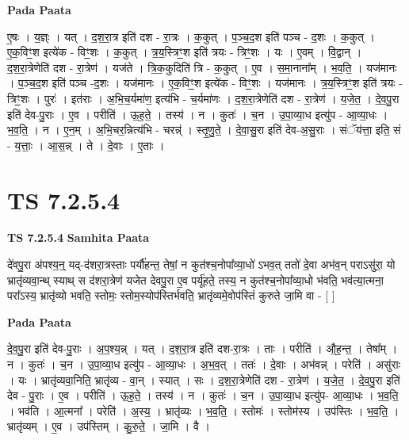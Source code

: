 \documentclass[17pt]{extarticle}
\begin{document}
\textbf{Pada Paata} \newline

ए॒षः । य॒ज्ञ्ः । यत् । द॒श॒रा॒त्र इति॑ दश - रा॒त्रः । क॒कुत् । प॒ञ्च॒द॒श इति॑ पञ्च - द॒शः । क॒कुत् । ए॒क॒विꣳ॒॒श इत्ये॑क - विꣳ॒॒शः । क॒कुत् । त्र॒य॒स्त्रिꣳ॒॒श इति॑ त्रयः - त्रिꣳ॒॒शः । यः । ए॒वम् । वि॒द्वान् । द॒श॒रा॒त्रेणेति॑ दश - रा॒त्रेण॑ । यज॑ते । त्रि॒क॒कुदिति॑ त्रि - क॒कुत् । ए॒व । स॒मा॒नाना᳚म् । भ॒व॒ति॒ । यज॑मानः । प॒ञ्च॒द॒श इति॑ पञ्च -द॒शः । यज॑मानः । ए॒क॒विꣳ॒॒श इत्ये॑क - विꣳ॒॒शः । यज॑मानः । त्र॒य॒स्त्रिꣳ॒॒श इति॑ त्रयः - त्रिꣳ॒॒शः । पुरः॑ । इत॑राः । अ॒भि॒च॒र्यमा॑ण॒ इत्य॑भि - च॒र्यमा॑णः । द॒श॒रा॒त्रेणेति॑ दश - रा॒त्रेण॑ । य॒जे॒त॒ । दे॒व॒पु॒रा इति॑ देव-पु॒राः । ए॒व । परीति॑ । ऊ॒ह॒ते॒ । तस्य॑ । न । कुतः॑ । च॒न । उ॒पा॒व्या॒ध इत्यु॑प - आ॒व्या॒धः । भ॒व॒ति॒ । न । ए॒न॒म् । अ॒भि॒चर॒न्नित्य॑भि - चरन्न्॑ । स्तृ॒णु॒ते॒ । दे॒वा॒सु॒रा इति॑ देव-अ॒सु॒राः । संॅय॑त्ता॒ इति॒ सं - य॒त्ताः॒ । आ॒स॒न्न् । ते । दे॒वाः । ए॒ताः ।  \newline




\section*{ TS 7.2.5.4 }

\textbf{TS 7.2.5.4 } \newline
\textbf{Samhita Paata} \newline

दे॑वपु॒रा अ॑पश्य॒न्॒ यद्-द॑शरा॒त्रस्ताः पर्यौ॑हन्त॒ तेषां॒ न कुत॑श्च॒नोपा᳚व्या॒धो॑ ऽभव॒त् ततो॑ दे॒वा अभ॑व॒न् पराऽसु॑रा॒ यो भ्रातृ॑व्यवा॒न्थ् स्याथ् स द॑शरा॒त्रेण॑ यजेत देवपु॒रा ए॒व पर्यू॑हते॒ तस्य॒ न कुत॑श्च॒नोपा᳚व्या॒धो भ॑वति॒ भव॑त्या॒त्मना॒ परा᳚ऽस्य॒ भ्रातृ॑व्यो भवति॒ स्तोमः॒ स्तोम॒स्योप॑स्तिर्भवति॒ भ्रातृ॑व्यमे॒वोप॑स्तिं कुरुते जा॒मि वा - [  ] \newline

\textbf{Pada Paata} \newline

दे॒व॒पु॒रा इति॑ देव-पु॒राः । अ॒प॒श्य॒न्न् । यत् । द॒श॒रा॒त्र इति॑ दश-रा॒त्रः । ताः । परीति॑ । औ॒ह॒न्त॒ । तेषा᳚म् । न । कुतः॑ । च॒न । उ॒पा॒व्या॒ध इत्यु॑प - आ॒व्या॒धः । अ॒भ॒व॒त् । ततः॑ । दे॒वाः । अभ॑वन्न् । परेति॑ । असु॑राः । यः । भ्रातृ॑व्यवा॒निति॒ भ्रातृ॑व्य - वा॒न् । स्यात् । सः । द॒श॒रा॒त्रेणेति॑ दश - रा॒त्रेण॑ । य॒जे॒त॒ । दे॒व॒पु॒रा इति॑ देव - पु॒राः । ए॒व । परीति॑ । ऊ॒ह॒ते॒ । तस्य॑ । न । कुतः॑ । च॒न । उ॒पा॒व्या॒ध इत्यु॑प- आ॒व्या॒धः । भ॒व॒ति॒ । भव॑ति । आ॒त्मना᳚ । परेति॑ । अ॒स्य॒ । भ्रातृ॑व्यः । भ॒व॒ति॒ । स्तोमः॑ । स्तोम॑स्य । उप॑स्तिः । भ॒व॒ति॒ । भ्रातृ॑व्यम् । ए॒व । उप॑स्तिम् । कु॒रु॒ते॒ । जा॒मि । वै ।  \newline
\end{document}
